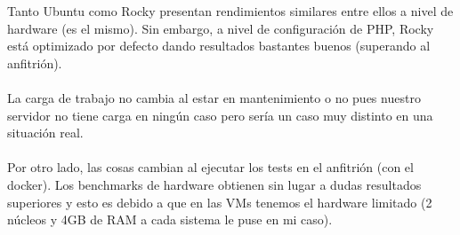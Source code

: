 Tanto Ubuntu como Rocky presentan rendimientos similares entre ellos a nivel de hardware (es el mismo). Sin embargo, a nivel de configuración de PHP, Rocky está optimizado por defecto dando resultados bastantes buenos (superando al anfitrión). 
\\\\
La carga de trabajo no cambia al estar en mantenimiento o no pues nuestro servidor no tiene carga en ningún caso pero sería un caso muy distinto en una situación real.
\\\\
Por otro lado, las cosas cambian al ejecutar los tests en el anfitrión (con el docker). Los benchmarks de hardware obtienen sin lugar a dudas resultados superiores y esto es debido a que en las VMs tenemos el hardware limitado (2 núcleos y 4GB de RAM a cada sistema le puse en mi caso).


